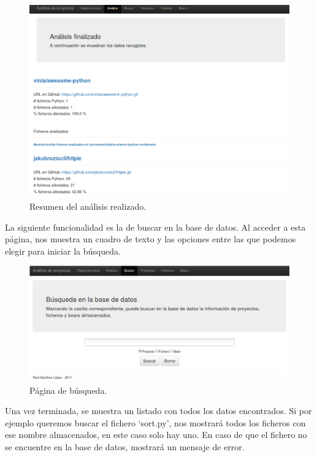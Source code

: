 \documentclass[a4paper, 12pt]{book}
\begin{document}
\begin{figure}[H]
  \centering
  \includegraphics[width=12cm, keepaspectratio]{img/resumenAnalisis}
  \caption{Resumen del análisis realizado.}
  \label{fig:resumenAnalisis}
\end{figure}

La siguiente funcionalidad es la de buscar en la base de datos. Al acceder a esta página, nos muestra un cuadro de texto y las opciones entre las que podemos elegir para iniciar la búsqueda.

\begin{figure}[H]
  \centering
  \includegraphics[width=12cm, keepaspectratio]{img/webBuscar}
  \caption{Página de búsqueda.}
  \label{fig:webBuscar}
\end{figure}

Una vez terminada, se muestra un listado con todos los datos encontrados. Si por ejemplo queremos buscar el fichero `sort.py', nos mostrará todos los ficheros con ese nombre almacenados, en este caso solo hay uno. En caso de que el fichero no se encuentre en la base de datos, mostrará un mensaje de error.
\end{document}
